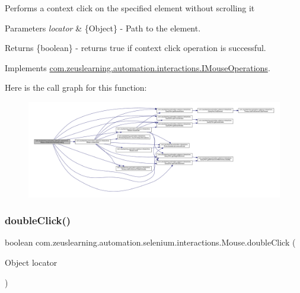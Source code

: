 Performs a context click on the specified element without scrolling it


\begin{DoxyParams}{Parameters}
{\em locator} & \{Object\} -\/ Path to the element. \\
\hline
\end{DoxyParams}
\begin{DoxyReturn}{Returns}
\{boolean\} -\/ returns {\ttfamily true} if context click operation is successful. 
\end{DoxyReturn}


Implements \hyperlink{interfacecom_1_1zeuslearning_1_1automation_1_1interactions_1_1IMouseOperations_a3db4879fa0f0848438b676769b352eec}{com.\+zeuslearning.\+automation.\+interactions.\+I\+Mouse\+Operations}.

Here is the call graph for this function\+:
\nopagebreak
\begin{figure}[H]
\begin{center}
\leavevmode
\includegraphics[width=350pt]{d0/dfa/classcom_1_1zeuslearning_1_1automation_1_1selenium_1_1interactions_1_1Mouse_a4da809ce4b2d0d9293b23bda7c3b98b0_cgraph}
\end{center}
\end{figure}
\hypertarget{classcom_1_1zeuslearning_1_1automation_1_1selenium_1_1interactions_1_1Mouse_a52db5f47eaacbf45fefed4f20be7fbf0}{}\label{classcom_1_1zeuslearning_1_1automation_1_1selenium_1_1interactions_1_1Mouse_a52db5f47eaacbf45fefed4f20be7fbf0} 
\subsubsection{\texorpdfstring{double\+Click()}{doubleClick()}}
{\footnotesize\ttfamily boolean com.\+zeuslearning.\+automation.\+selenium.\+interactions.\+Mouse.\+double\+Click (\begin{DoxyParamCaption}\item[{Object}]{locator }\end{DoxyParamCaption})\hspace{0.3cm}{\ttfamily [inline]}}

